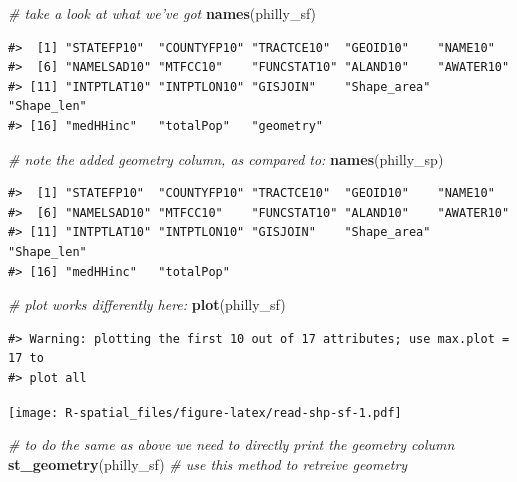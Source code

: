 \documentclass[]{book}
\newenvironment{Shaded}{\begin{snugshade}}{\end{snugshade}}
\newcommand{\KeywordTok}[1]{\textcolor[rgb]{0.13,0.29,0.53}{\textbf{#1}}}
\newcommand{\CommentTok}[1]{\textcolor[rgb]{0.56,0.35,0.01}{\textit{#1}}}
\newcommand{\NormalTok}[1]{#1}
\theoremstyle{definition}
\theoremstyle{definition}
\theoremstyle{definition}
\theoremstyle{remark}
\begin{document}
\begin{Shaded}
\begin{Highlighting}[]
\CommentTok{# take a look at what we've got}
\KeywordTok{names}\NormalTok{(philly_sf)}
\end{Highlighting}
\end{Shaded}

\begin{verbatim}
#>  [1] "STATEFP10"  "COUNTYFP10" "TRACTCE10"  "GEOID10"    "NAME10"    
#>  [6] "NAMELSAD10" "MTFCC10"    "FUNCSTAT10" "ALAND10"    "AWATER10"  
#> [11] "INTPTLAT10" "INTPTLON10" "GISJOIN"    "Shape_area" "Shape_len" 
#> [16] "medHHinc"   "totalPop"   "geometry"
\end{verbatim}

\begin{Shaded}
\begin{Highlighting}[]
\CommentTok{# note the added geometry column, as compared to:}
\KeywordTok{names}\NormalTok{(philly_sp)}
\end{Highlighting}
\end{Shaded}

\begin{verbatim}
#>  [1] "STATEFP10"  "COUNTYFP10" "TRACTCE10"  "GEOID10"    "NAME10"    
#>  [6] "NAMELSAD10" "MTFCC10"    "FUNCSTAT10" "ALAND10"    "AWATER10"  
#> [11] "INTPTLAT10" "INTPTLON10" "GISJOIN"    "Shape_area" "Shape_len" 
#> [16] "medHHinc"   "totalPop"
\end{verbatim}

\begin{Shaded}
\begin{Highlighting}[]
\CommentTok{# plot works differently here:}
\KeywordTok{plot}\NormalTok{(philly_sf)}
\end{Highlighting}
\end{Shaded}

\begin{verbatim}
#> Warning: plotting the first 10 out of 17 attributes; use max.plot = 17 to
#> plot all
\end{verbatim}

\texttt{[image: R-spatial\_files/figure-latex/read-shp-sf-1.pdf]}

\begin{Shaded}
\begin{Highlighting}[]
\CommentTok{# to do the same as above we need to directly print the geometry column}
\KeywordTok{st_geometry}\NormalTok{(philly_sf)        }\CommentTok{# use this method to retreive geometry}
\end{Highlighting}
\end{Shaded}
\end{document}
